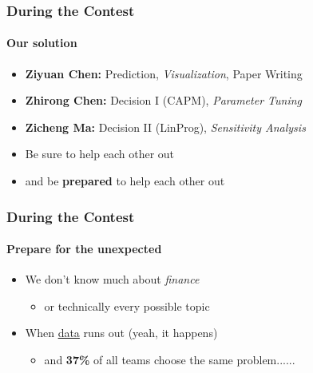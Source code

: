\documentclass{beamer}
\begin{document}
\begin{frame}
    \frametitle{During the Contest}
    \framesubtitle{Our solution}
    \begin{itemize}
        \setlength{\itemsep}{5pt}
        \item \textbf{Ziyuan Chen:} Prediction, \textit{Visualization}, Paper Writing
        \item \textbf{Zhirong Chen:} Decision I (CAPM), \textit{Parameter Tuning}
        \item \textbf{Zicheng Ma:} Decision II (LinProg), \textit{Sensitivity Analysis}
    \end{itemize}
    \vspace{20pt}
    \begin{itemize}
        \setlength{\itemsep}{5pt}
        \item Be sure to help each other out
        \item and be \textbf{prepared} to help each other out
    \end{itemize}
\end{frame}


\begin{frame}
    \frametitle{During the Contest}
    \framesubtitle{Prepare for the unexpected}
    \begin{itemize}
        \setlength{\itemsep}{10pt}
        \item We don't know much about \textit{finance}
        \begin{itemize}
            \item or technically every possible topic
        \end{itemize}
        \item When \href{https://www.mathmodels.org/Problems/2022/MCM-C/2022_Problem_C_DATA.zip}{data} runs out (yeah, it happens)
        \begin{itemize}
            \item and \textbf{37\%} of all teams choose the same problem......
        \end{itemize}
    \end{itemize}
\end{frame}
\end{document}
